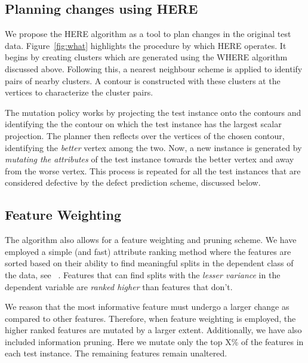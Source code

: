 \documentclass[conference]{IEEEtran}
\begin{document}
\subsection{Planning changes using HERE}
We propose the HERE algorithm as a tool to plan changes in the original test data. Figure~\ref{fig:what} highlights the procedure by which HERE operates. It begins by creating clusters which are generated using the WHERE algorithm discussed above. Following this, a nearest neighbour scheme is applied to identify pairs of nearby clusters. A contour is constructed with these clusters at the vertices to characterize the cluster pairs.

The mutation policy works by projecting the test instance onto the contours and identifying the the contour on which the test instance has the largest scalar projection. The planner then reflects over the vertices of the chosen contour, identifying the \textit{better} vertex among the two. Now, a new instance is generated by \textit{mutating the attributes} of the test instance towards the better vertex and away from the worse vertex. This process is repeated for all the test instances that are considered defective by the defect prediction scheme, discussed below.

\subsection{Feature Weighting} \label{fwt}
The algorithm also allows for a feature weighting and pruning scheme. We have employed a simple (and fast) attribute ranking method where the features are sorted based on their ability to find meaningful splits in the dependent class of the data, see ~\cite{hall03}. Features that can find splits with the \textit{lesser variance} in the dependent variable are \textit{ranked higher} than features that don't. 

We reason that the most informative feature must undergo a larger change as compared to other features. Therefore, when feature weighting is employed, the higher ranked features are mutated by a larger extent. Additionally, we have also included information pruning. Here we mutate only the top X\% of the features in each test instance. The remaining features remain unaltered. 
\end{document}
